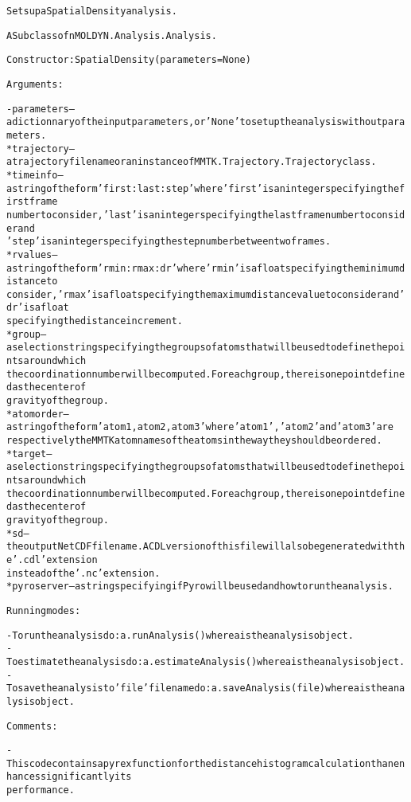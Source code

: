 \begin{alltt}
Sets up a Spatial Density analysis.

A Subclass of nMOLDYN.Analysis.Analysis. 

Constructor: SpatialDensity({\textbar}parameters{\textbar} = None)

Arguments:

    - {\textbar}parameters{\textbar} -- a dictionnary of the input parameters, or 'None' to set up the analysis without parameters.
        * trajectory -- a trajectory file name or an instance of MMTK.Trajectory.Trajectory class.
        * timeinfo   -- a string of the form 'first:last:step' where 'first' is an integer specifying the first frame 
                        number to consider, 'last' is an integer specifying the last frame number to consider and 
                        'step' is an integer specifying the step number between two frames.
        * rvalues    -- a string of the form 'rmin:rmax:dr' where 'rmin' is a float specifying the minimum distance to 
                        consider, 'rmax' is a float specifying the maximum distance value to consider and 'dr' is a float
                        specifying the distance increment. 
        * group      -- a selection string specifying the groups of atoms that will be used to define the points around which 
                        the coordination number will be computed. For each group, there is one point defined as the center of 
                        gravity of the group.
        * atomorder  -- a string of the form 'atom1,atom2,atom3' where 'atom1', 'atom2' and 'atom3' are 
                        respectively the MMTK atom names of the atoms in the way they should be ordered.
        * target     -- a selection string specifying the groups of atoms that will be used to define the points around which 
                        the coordination number will be computed. For each group, there is one point defined as the center of 
                        gravity of the group.
        * sd         -- the output NetCDF file name. A CDL version of this file will also be generated with the '.cdl' extension
                        instead of the '.nc' extension.
        * pyroserver -- a string specifying if Pyro will be used and how to run the analysis.

Running modes:

    - To run the analysis do: a.runAnalysis() where a is the analysis object.
    - To estimate the analysis do: a.estimateAnalysis() where a is the analysis object.
    - To save the analysis to 'file' file name do: a.saveAnalysis(file) where a is the analysis object.

Comments:        
    
    - This code contains a pyrex function for the distance histogram calculation than enhances significantly its 
      performance.
\end{alltt}


